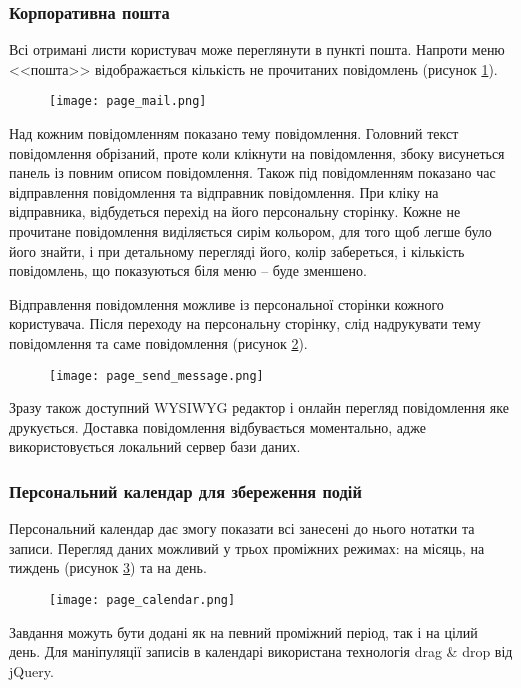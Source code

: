 \subsubsection{Корпоративна пошта}
\par Всі отримані листи користувач може переглянути в пункті пошта. Напроти меню <<пошта>> відображається кількість не прочитаних повідомлень (рисунок \ref{pic:page_mail}).
  \begin{figure}[!ht]
  \centering
      \texttt{[image: page\_mail.png]}
      \vspace{18pt}
      \label{pic:page_mail}
  \end{figure}
\par Над кожним повідомленням показано тему повідомлення. Головний текст повідомлення обрізаний, проте коли клікнути на повідомлення, збоку висунеться панель із повним описом повідомлення. Також під повідомленням показано час відправлення повідомлення та відправник повідомлення. При кліку на відправника, відбудеться перехід на його персональну сторінку. Кожне не прочитане повідомлення виділяється сирім кольором, для того щоб легше було його знайти, і при детальному перегляді його, колір забереться, і кількість повідомлень, що показуються біля меню -- буде зменшено.
\par Відправлення повідомлення можливе із персональної сторінки кожного користувача. Після переходу на персональну сторінку, слід надрукувати тему повідомлення та саме повідомлення (рисунок \ref{pic:page_send_message}).
  \begin{figure}[!ht]
  \centering
      \texttt{[image: page\_send\_message.png]}
      \vspace{18pt}
      \label{pic:page_send_message}
  \end{figure}
\par Зразу також доступний WYSIWYG редактор і онлайн перегляд повідомлення яке друкується. Доставка повідомлення відбувається моментально, адже використовується локальний сервер бази даних.

\subsubsection{Персональний календар для збереження подій}
Персональний календар дає змогу показати всі занесені до нього нотатки та записи. Перегляд даних можливий у трьох проміжних режимах: на місяць, на тиждень (рисунок \ref{pic:page_calendar}) та на день.
  \begin{figure}[!ht]
  \centering
      \texttt{[image: page\_calendar.png]}
      \vspace{18pt}
      \label{pic:page_calendar}
  \end{figure}
\par Завдання можуть бути додані як на певний проміжний період, так і на цілий день. Для маніпуляції записів в календарі використана технологія drag \& drop від jQuery.

